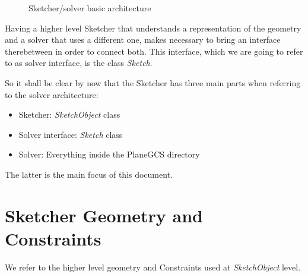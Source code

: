 \documentclass[12pt,twoside,a4paper]{book}
\newcommand{\SketchObject}{\emph{SketchObject}}
\newcommand{\Sketch}{\emph{Sketch}}
\begin{document}
    \begin{figure}
    \caption{Sketcher/solver basic architecture}
    \end{figure}

    Having a higher level Sketcher that understands a representation of the geometry and a solver that uses a different one, makes necessary to bring an interface therebetween in order to connect both. This interface, which we are going to refer to as solver interface, is the class \Sketch{}.

    So it shall be clear by now that the Sketcher has three main parts when referring to the solver architecture:

    \begin{itemize}
    \item Sketcher: \SketchObject{} class
    \item Solver interface: \Sketch{} class
    \item Solver: Everything inside the PlaneGCS directory
    \end{itemize}

    The latter is the main focus of this document.

    \section{Sketcher Geometry and Constraints}

    We refer to the higher level geometry and Constraints used at \SketchObject{} level.
\end{document}
